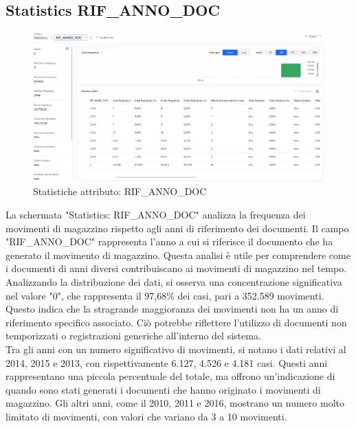 \documentclass{article}
\begin{document}
\subsection{Statistics RIF\_ANNO\_DOC}
\begin{figure}[H]
    \centering
    \includegraphics[width=\textwidth]{imgMicrosoft/DatiReali/StatisticsRIFANNODOCDatiReali.png}
    \caption{Statistiche attributo: RIF\_ANNO\_DOC}
    \label{fig:statistics-RIF-ANNO-DOC}
\end{figure}
La schermata "Statistics: RIF\_ANNO\_DOC" analizza la frequenza dei movimenti di magazzino rispetto agli anni di riferimento dei documenti. Il campo "RIF\_ANNO\_DOC" rappresenta l'anno a cui si riferisce il documento che ha generato il movimento di magazzino. Questa analisi è utile per comprendere come i documenti di anni diversi contribuiscano ai movimenti di magazzino nel tempo.\\
Analizzando la distribuzione dei dati, si osserva una concentrazione significativa nel valore "0", che rappresenta il 97,68\% dei casi, pari a 352.589 movimenti. Questo indica che la stragrande maggioranza dei movimenti non ha un anno di riferimento specifico associato. Ciò potrebbe riflettere l'utilizzo di documenti non temporizzati o registrazioni generiche all'interno del sistema.\\
Tra gli anni con un numero significativo di movimenti, si notano i dati relativi al 2014, 2015 e 2013, con rispettivamente 6.127, 4.526 e 4.181 casi. Questi anni rappresentano una piccola percentuale del totale, ma offrono un'indicazione di quando sono stati generati i documenti che hanno originato i movimenti di magazzino. Gli altri anni, come il 2010, 2011 e 2016, mostrano un numero molto limitato di movimenti, con valori che variano da 3 a 10 movimenti.
\end{document}
